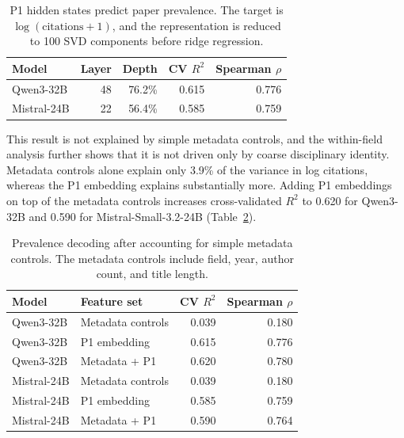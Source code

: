 \documentclass[11pt]{article}
\begin{document}
\setlength{\tabcolsep}{4pt}
\begin{table}[t]
\centering
\footnotesize

\begin{tabular}{lrrrr}
\toprule
\textbf{Model} & \textbf{Layer} & \textbf{Depth} & \textbf{CV $R^2$} & \textbf{Spearman $\rho$} \\
\midrule
Qwen3-32B & 48 & 76.2\% & 0.615 & 0.776 \\
Mistral-24B & 22 & 56.4\% & 0.585 & 0.759 \\
\bottomrule
\end{tabular}
\caption{P1 hidden states predict paper prevalence. The target is
$\log(\mathrm{citations}+1)$, and the representation is reduced to 100 SVD
components before ridge regression.}
\label{tab:appendix_prevalence_decoding}
\end{table}

This result is not explained by simple metadata controls, and the within-field analysis further shows that it is not driven only by coarse disciplinary identity.  Metadata controls alone explain only
3.9\% of the variance in log citations, whereas the P1 embedding explains
substantially more.  Adding P1 embeddings on top of the metadata controls
increases cross-validated $R^2$ to 0.620 for Qwen3-32B and 0.590 for
Mistral-Small-3.2-24B (Table~\ref{tab:appendix_adjusted_decoding}).

\setlength{\tabcolsep}{4pt}
\begin{table}[t]
\centering
\footnotesize

\begin{tabular}{llrr}
\toprule
\textbf{Model} & \textbf{Feature set} & \textbf{CV $R^2$} & \textbf{Spearman $\rho$} \\
\midrule
Qwen3-32B & Metadata controls & 0.039 & 0.180 \\
Qwen3-32B & P1 embedding & 0.615 & 0.776 \\
Qwen3-32B & Metadata + P1 & 0.620 & 0.780 \\
\midrule
Mistral-24B & Metadata controls & 0.039 & 0.180 \\
Mistral-24B & P1 embedding & 0.585 & 0.759 \\
Mistral-24B & Metadata + P1 & 0.590 & 0.764 \\
\bottomrule
\end{tabular}
\caption{Prevalence decoding after accounting for simple metadata controls.  The
metadata controls include field, year, author count, and title length.}
\label{tab:appendix_adjusted_decoding}
\end{table}
\end{document}
